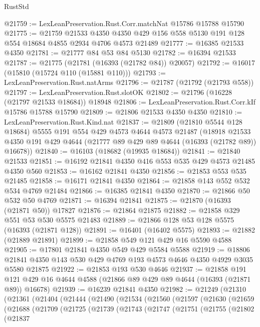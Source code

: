 \begin{lexlean}{RustStd}
\begin{coremodule}
@21759 := LexLeanPreservation.Rust.Corr.matchNat @15786 @15788 @15790
@21775 := @21759
    @21533
    @4350
    @4350
    @429
    @156
    @558
    @5130
    @191
    @128
    @554
    @18684
    @4855
    @2934
    @4706
    @4573
    @21489
@21777 := @16385 @21533 @4350
@21781 := @21777 @84 @53 @84 @5130
@21782 := @16394 @21533
@21787 := @21775 (@21781 (@16393 (@21782 @84)) @20057)
@21792 := @16017 (@15810 (@15724 @110 (@15881 @110)))
@21793 := LexLeanPreservation.Rust.natArms
@21796 := @21787 (@21792 (@21793 @558))
@21797 := LexLeanPreservation.Rust.slotOK
@21802 := @21796 (@16228 (@21797 @21533 @18684)) @18948
@21806 := LexLeanPreservation.Rust.Corr.kIf @15786 @15788 @15790
@21809 := @21806 @21533 @4350 @4350
@21810 := LexLeanPreservation.Rust.Kind.nat
@21837 := @21809
    (@21810 @5544 @128 @18684)
    @5555
    @191
    @554
    @429
    @4573
    @4644
    @4573
    @21487
    (@18918 @21533 @4350 @191 @429 @4644 (@21777 @89 @429 @89 @4644 (@16393 (@21782 @89)) @16678))
@21840 := @16103 (@18682 (@19935 @18684))
@21841 := @21840 @21533
@21851 := @16192 @21841 @4350 @416 @553 @535 @429 @4573 @21485 @4350 @560
@21853 := @16162 @21841 @4350
@21856 := @21853 @553 @535 @21485
@21858 := @16171 @21841 @4350
@21864 := @21858 @143 @552 @532 @534 @4769 @21484
@21866 := @16385 @21841 @4350
@21870 := @21866 @50 @532 @50 @4769
@21871 := @16394 @21841
@21875 := @21870 (@16393 (@21871 @50)) @17827
@21876 := @21864 @21875
@21882 := @21858 @329 @551 @53 @530 @5575 @21483
@21889 := @21866 @128 @53 @128 @5575 (@16393 (@21871 @128))
@21891 := @16401 (@16402 @5575)
@21893 := @21882 (@21889 @21891)
@21899 := @21858 @549 @121 @429 @16 @5590 @4588
@21905 := @17801 @21841 @4350 @549 @429 @5584 @5588
@21919 := @18806 @21841 @4350 @143 @530 @429 @4769 @193 @4573 @4646 @4350 @4929 @3035 @5580 @21875
@21922 := @21853 @193 @530 @4646
@21937 := @21858
    @191
    @121
    @429
    @16
    @4644
    @4588
    (@21866 @89 @429 @89 @4644 (@16393 (@21871 @89)) @16678)
@21939 := @16239 @21841 @4350
@21982 := @21249
    (@21310
      (@21361
        (@21404
          (@21444
            (@21490
              (@21534
                (@21560
                  (@21597
                    (@21630
                      (@21659
                        (@21688
                          (@21709
                            (@21725
                              (@21739
                                (@21743
                                  (@21747
                                    (@21751
                                      (@21755
                                        (@21802
                                          (@21837

\end{coremodule}
\end{lexlean}

